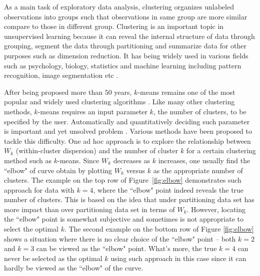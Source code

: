 \documentclass[12pt]{article}
\begin{document}
As a main task of exploratory data analysis, clustering organizes unlabeled
observations into groups such that observations in same group are more similar
compare to those in different group. Clustering is an important topic in
unsupervised learning because it can reveal the internal structure of data
through grouping, segment the data through partitioning and summarize data for
other purposes such as dimension reduction. It has being widely used in
various fields such as psychology, biology, statistics and machine learning
including pattern recognition, image segmentation etc \citep{jain1999data}.

After being proposed more than $50$ years, $k$-means remains one of the most
popular and widely used clustering algorithms \citep{jain2010data}. Like many
other clustering methods, $k$-means requires an input parameter $k$, the
number of clusters, to be specified by the user. Automatically and
quantitatively deciding such parameter is important and yet unsolved problem
\citep{fujita2014non}. Various methods have been proposed to tackle this
difficulty. One ad hoc approach is to explore the relationship between $W_k$
(within-cluster dispersion) and the number of cluster $k$ for a certain
clustering method such as $k$-means. Since $W_k$ decreases as $k$ increases,
one usually find the ``elbow" of curve obtain by plotting $W_k$ versus $k$ as
the appropriate number of clusters. The example on the top row of
Figure~\ref{fig:elbow} demonstrates such approach for data with $k=4$, where
the ``elbow" point indeed reveals the true number of clusters. This is based
on the idea that under partitioning data set has more impact than over
partitioning data set in terms of $W_k$. However, locating the ``elbow" point
is somewhat subjective and sometimes is not appropriate to select the optimal
$k$. The second example on the bottom row of Figure \ref{fig:elbow} shows a
situation where there is no clear choice of the ``elbow" point -- both $k=2$
and $k=3$ can be viewed as the ``elbow" point. What's more, the true $k=4$ can
never be selected as the optimal $k$ using such approach in this case since it
can hardly be viewed as the ``elbow" of the curve.
\end{document}
